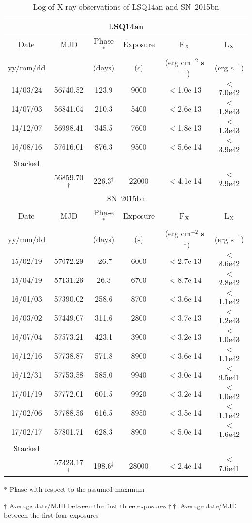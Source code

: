 \documentclass[useAMS,usenatbib]{mn2e}
\begin{document}
\begin{table*}
\caption{Log of X-ray observations of LSQ14an and SN~2015bn}
\begin{center}
\begin{tabular}{cccccc}
\hline
\hline
\multicolumn{6}{c}{LSQ14an}\\
\hline
Date & MJD & Phase$^*$ & Exposure& F$_{\rm X}$& L$_{\rm X}$ \\
yy/mm/dd &  & (days)  & (s)  & (erg cm$^{-2}$ s$^{-1}$)& (erg s$^{-1}$)\\
\hline
14/03/24 & 56740.52  & 123.9 &9000&  $<$1.0e-13   &  $<$7.0e42   \\
14/07/03 & 56841.04  &  210.3  &5400&  $<$2.6e-13 &   $<$1.8e43  \\
14/12/07 & 56998.41  &  345.5  &7600&    $<$1.8e-13 & $<$1.3e43 \\
16/08/16 & 57616.01  &  876.3  &9500&    $<$5.6e-14 & $<$3.9e42 \\
\hline
Stacked &  &  & & & \\
\hline
 & 56859.70$^{\dagger}$ & 226.3$^{\dagger}$ & 22000 & $<$4.1e-14 & $<$2.9e42 \\
\hline
\hline
\multicolumn{6}{c}{SN~2015bn}\\
\hline
Date & MJD & Phase$^*$ & Exposure& F$_{\rm X}$& L$_{\rm X}$ \\
yy/mm/dd &  & (days)  & (s)  & (erg cm$^{-2}$ s$^{-1}$)& (erg s$^{-1}$)\\
\hline
15/02/19 & 57072.29 & -26.7 &6000&   $<$2.7e-13   &  $<$8.6e42  \\
15/04/19 & 57131.26  & 26.3 &6700&   $<$8.7e-14 &  $<$2.8e42 \\
16/01/03 & 57390.02  & 258.6 & 8700&  $<$3.6e-14 &  $<$1.1e42 \\
16/03/02 & 57449.07 & 311.6  & 2800&   $<$3.7e-13 & $<$1.2e43 \\
16/07/04 & 57573.21 & 423.1 & 3900& $<$3.2e-13  &  $<$1.0e43\\
16/12/16 & 57738.87& 571.8 & 8900 & $<$3.6e-14 & $<$1.1e42 \\
16/12/31 & 57753.58 & 585.0  & 9940 & $<$3.0e-14 & $<$9.5e41 \\
17/01/19 & 57772.01& 601.5 & 9920 &  $<$3.2e-14 & $<$1.0e42\\
17/02/06 & 57788.56 & 616.5 & 8950 & $<$3.5e-14 & $<$1.1e42 \\
17/02/17 & 57801.71 & 628.3 & 8900 & $<$5.0e-14 & $<$1.6e42 \\
\hline
Stacked &  &  & & & \\
\hline
  & 57323.17$^{\ddagger}$ &198.6$^{\ddagger}$ & 28000 & $<$2.4e-14 & $<$7.6e41  \\
 \hline
\end{tabular}
\label{table:xr}
\end{center}
* Phase with respect to the assumed maximum

$\dagger$ Average date/MJD between the first three exposures
$\dagger\dagger$ Average date/MJD between the first four exposures
\label{table:snx}
\end{table*}
\end{document}
